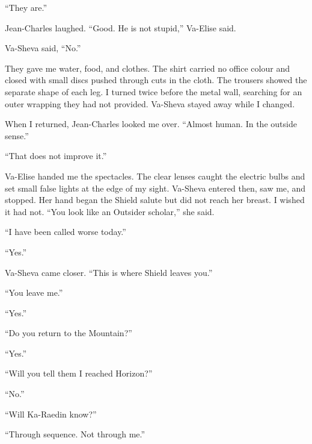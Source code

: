 ``They are.''\par

Jean-Charles laughed. ``Good. He is not stupid,'' Va-Elise said.\par

Va-Sheva said, ``No.''\par

\ornament

They gave me water, food, and clothes. The shirt carried no office colour and closed with small discs pushed through cuts in the cloth. The trousers showed the separate shape of each leg. I turned twice before the metal wall, searching for an outer wrapping they had not provided. Va-Sheva stayed away while I changed.\par

When I returned, Jean-Charles looked me over. ``Almost human. In the outside sense.''\par

``That does not improve it.''\par

Va-Elise handed me the spectacles. The clear lenses caught the electric bulbs and set small false lights at the edge of my sight. Va-Sheva entered then, saw me, and stopped. Her hand began the Shield salute but did not reach her breast. I wished it had not. ``You look like an Outsider scholar,'' she said.\par

``I have been called worse today.''\par

``Yes.''\par

Va-Sheva came closer. ``This is where Shield leaves you.''\par

``You leave me.''\par

``Yes.''\par

``Do you return to the Mountain?''\par

``Yes.''\par

``Will you tell them I reached Horizon?''\par

``No.''\par

``Will Ka-Raedin know?''\par

``Through sequence. Not through me.''\par

